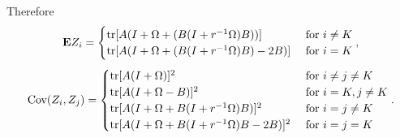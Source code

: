\documentclass[12pt]{article}
\begin{document}
Therefore
\[
\textbf{E} Z_i = \begin{cases}
\text{tr}[A (I + \Omega + (B(I + r^{-1}\Omega) B))] & \text{ for }i \neq K\\
\text{tr}[A (I + \Omega + (B(I + r^{-1}\Omega) B) - 2B)] & \text{ for }i = K
\end{cases},
\]
\[
\text{Cov}(Z_i, Z_j) = 
\begin{cases}
\text{tr}[A (I + \Omega)]^2 & \text{ for }i \neq j \neq K\\
\text{tr}[A (I + \Omega - B)]^2 & \text{ for }i =K, j \neq K\\
\text{tr}[A (I + \Omega + B(I + r^{-1}\Omega) B)]^2 & \text{ for }i=j \neq K\\
\text{tr}[A (I + \Omega + B(I + r^{-1}\Omega) B - 2B)]^2 & \text{ for }i=j=K
\end{cases}.
\]
\end{document}
